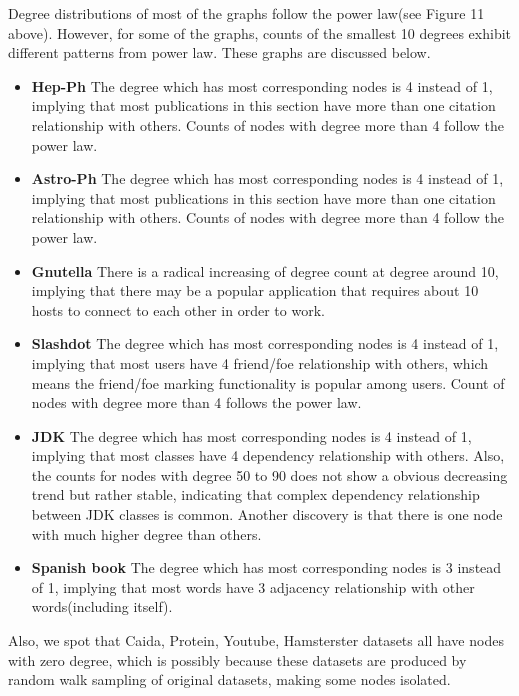 \par Degree distributions of most of the graphs follow the power law(see Figure 11 above). However, for some of the graphs, counts of the smallest 10 degrees exhibit different patterns from power law. These graphs are discussed below.

\begin{itemize}
\item \textbf{Hep-Ph} The degree which has most corresponding nodes is 4 instead of 1, implying that most publications in this section have more than one citation relationship with others. Counts of nodes with degree more than 4 follow the power law.
\item \textbf{Astro-Ph} The degree which has most corresponding nodes is 4 instead of 1, implying that most publications in this section have more than one citation relationship with others. Counts of nodes with degree more than 4 follow the power law.
\item \textbf{Gnutella} There is a radical increasing of degree count at degree around 10, implying that there may be a popular application that requires about 10 hosts to connect to each other in order to work.
\item \textbf{Slashdot} The degree which has most corresponding nodes is 4 instead of 1, implying that most users have 4 friend/foe relationship with others, which means the friend/foe marking functionality is popular among users. Count of nodes with degree more than 4 follows the power law.
\item \textbf{JDK} The degree which has most corresponding nodes is 4 instead of 1, implying that most classes have 4 dependency relationship with others. Also, the counts for nodes with degree 50 to 90 does not show a obvious decreasing trend but rather stable, indicating that complex dependency relationship between JDK classes is common. Another discovery is that there is one node with much higher degree than others.
\item \textbf{Spanish book} The degree which has most corresponding nodes is 3 instead of 1, implying that most words have 3 adjacency relationship with other words(including itself).
\end{itemize}

\par Also, we spot that Caida, Protein, Youtube, Hamsterster datasets all have nodes with zero degree, which is possibly because these datasets are produced by random walk sampling of original datasets, making some nodes isolated.


